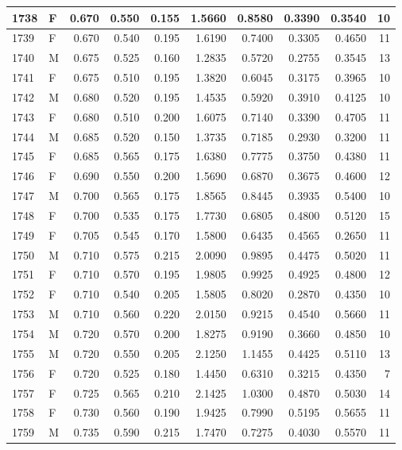\documentclass[9pt,twocolumn,twoside,]{pnas-new}
\begin{document}
\begin{tabular}{l|l|r|r|r|r|r|r|r|r}
\hline
1738 & F & 0.670 & 0.550 & 0.155 & 1.5660 & 0.8580 & 0.3390 & 0.3540 & 10\\
\hline
1739 & F & 0.670 & 0.540 & 0.195 & 1.6190 & 0.7400 & 0.3305 & 0.4650 & 11\\
\hline
1740 & M & 0.675 & 0.525 & 0.160 & 1.2835 & 0.5720 & 0.2755 & 0.3545 & 13\\
\hline
1741 & F & 0.675 & 0.510 & 0.195 & 1.3820 & 0.6045 & 0.3175 & 0.3965 & 10\\
\hline
1742 & M & 0.680 & 0.520 & 0.195 & 1.4535 & 0.5920 & 0.3910 & 0.4125 & 10\\
\hline
1743 & F & 0.680 & 0.510 & 0.200 & 1.6075 & 0.7140 & 0.3390 & 0.4705 & 11\\
\hline
1744 & M & 0.685 & 0.520 & 0.150 & 1.3735 & 0.7185 & 0.2930 & 0.3200 & 11\\
\hline
1745 & F & 0.685 & 0.565 & 0.175 & 1.6380 & 0.7775 & 0.3750 & 0.4380 & 11\\
\hline
1746 & F & 0.690 & 0.550 & 0.200 & 1.5690 & 0.6870 & 0.3675 & 0.4600 & 12\\
\hline
1747 & M & 0.700 & 0.565 & 0.175 & 1.8565 & 0.8445 & 0.3935 & 0.5400 & 10\\
\hline
1748 & F & 0.700 & 0.535 & 0.175 & 1.7730 & 0.6805 & 0.4800 & 0.5120 & 15\\
\hline
1749 & F & 0.705 & 0.545 & 0.170 & 1.5800 & 0.6435 & 0.4565 & 0.2650 & 11\\
\hline
1750 & M & 0.710 & 0.575 & 0.215 & 2.0090 & 0.9895 & 0.4475 & 0.5020 & 11\\
\hline
1751 & F & 0.710 & 0.570 & 0.195 & 1.9805 & 0.9925 & 0.4925 & 0.4800 & 12\\
\hline
1752 & F & 0.710 & 0.540 & 0.205 & 1.5805 & 0.8020 & 0.2870 & 0.4350 & 10\\
\hline
1753 & M & 0.710 & 0.560 & 0.220 & 2.0150 & 0.9215 & 0.4540 & 0.5660 & 11\\
\hline
1754 & M & 0.720 & 0.570 & 0.200 & 1.8275 & 0.9190 & 0.3660 & 0.4850 & 10\\
\hline
1755 & M & 0.720 & 0.550 & 0.205 & 2.1250 & 1.1455 & 0.4425 & 0.5110 & 13\\
\hline
1756 & F & 0.720 & 0.525 & 0.180 & 1.4450 & 0.6310 & 0.3215 & 0.4350 & 7\\
\hline
1757 & F & 0.725 & 0.565 & 0.210 & 2.1425 & 1.0300 & 0.4870 & 0.5030 & 14\\
\hline
1758 & F & 0.730 & 0.560 & 0.190 & 1.9425 & 0.7990 & 0.5195 & 0.5655 & 11\\
\hline
1759 & M & 0.735 & 0.590 & 0.215 & 1.7470 & 0.7275 & 0.4030 & 0.5570 & 11\\

\end{tabular}
\end{document}
